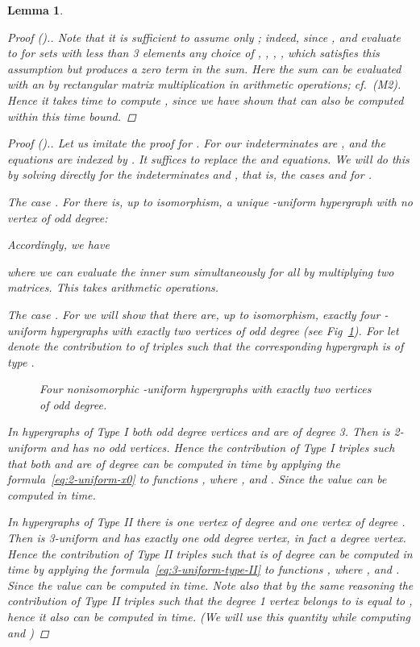 \documentclass{amsart}
\newtheorem{Lem}{Lemma}
\begin{document}
\begin{Lem}
\begin{proof}[Proof ().]
Note that it is sufficient to assume only ; indeed, since ,  and  evaluate to  for sets with less than 3 elements any choice of , , , ,  which satisfies this assumption but  produces a zero term in the sum.
Here the sum  can be evaluated with an  by 
 rectangular matrix multiplication in 
arithmetic operations; cf.~(M2). 
Hence it takes  time to compute , since we have shown that  can also be computed within this time bound.
\end{proof}

\begin{proof}[Proof ().]
Let us imitate the proof for .
For  our indeterminates are , 
and the equations are indexed by . 
It suffices to replace the  and  equations. 
We will do this by solving directly for
the indeterminates  and , that is, the cases  and 
for .

{\em The case .}
For  there is, up to isomorphism, a unique 
-uniform hypergraph  with no vertex of odd degree:

Accordingly, we have

where we can evaluate the inner sum simultaneously for all  
by multiplying two  matrices. This takes 
arithmetic operations.



{\em The case .}
For  we will show that there are, up to isomorphism, exactly four 
-uniform hypergraphs  with exactly two
vertices  of odd degree (see Fig~\ref{fig:4-uniform-j=2}).
For  let  denote the contribution to  of triples  such that the corresponding hypergraph is of type .

\begin{figure}[t]

\caption{\label{fig:4-uniform-j=2}Four nonisomorphic -uniform hypergraphs with exactly two vertices of odd degree.}
\end{figure}


In hypergraphs of Type I both odd degree vertices  and  are of degree 3.
Then  is 2-uniform and has no odd vertices.
Hence the contribution  of Type I triples such that both  and  are of degree  can be computed in time  by applying the formula~\eqref{eq:2-uniform-x0} to functions , where ,  and . 
Since 
the value  can be computed in  time.

In hypergraphs of Type II there is one vertex  of degree  and one vertex  of degree .
Then  is 3-uniform and has exactly one odd degree vertex, in fact a degree  vertex.
Hence the contribution  of Type II triples such that  is of degree  can be computed in time  by applying the formula~\eqref{eq:3-uniform-type-II} to functions , where ,  and . 
Since 
the value  can be computed in  time.
Note also that by the same reasoning the contribution  of Type II triples  such that the degree 1 vertex belongs to  is equal to , hence it also can be computed in  time. (We will use this quantity while computing  and )


\end{proof}
\end{Lem}
\end{document}
